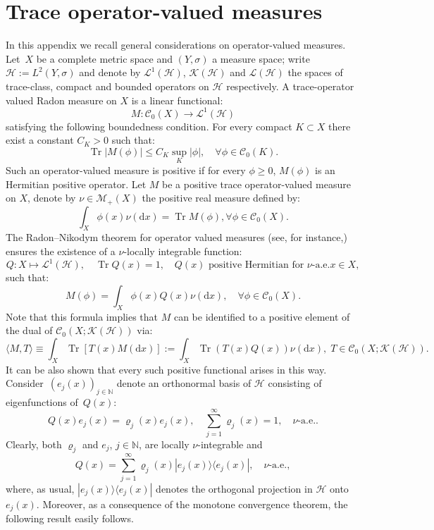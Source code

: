 \documentclass[AHL,Unicode,longabstracts]{cedram}
\DeclareMathOperator{\Trr}{Tr}
\newcommand*\N{{\mathbb N}}
\newcommand*\Tr{\Trr}
\newcommand{\To}{\longrightarrow}
\numberwithin{equation}{section}
\let\oldforall\forall
\renewcommand*{\forall}{\mathrel{\oldforall}}
\newcommand*{\dd}{\mathrm{d}}
\newcommand*{\dx}{\dd x}
\begin{document}
\section{Trace operator-valued measures}\label{sec:ovm}
In this appendix we recall general considerations on operator-valued measures. Let~$X$ be a complete metric space and $(Y,\sigma)$ a measure space; write $\mathcal{H}:=L^2(Y,\sigma)$ and denote by $\mathcal{L}^1(\mathcal{H})$, $\mathcal{K}(\mathcal{H})$ and $\mathcal{L}(\mathcal{H})$ the spaces of trace-class, compact and bounded operators on $\mathcal{H}$ respectively. A trace-operator valued Radon measure on $X$ is a linear functional:
\[
M:\mathcal{C}_0(X)\To \mathcal{L}^1(\mathcal{H})
\]
satisfying the following boundedness condition. For every compact $K\subset X$ there exist a constant $C_K>0$ such that:
\[
\Tr|M(\phi)|\leq C_K \sup_K|\phi|,\quad \forall \phi\in\mathcal{C}_0(K).
\]
Such an operator-valued measure is positive if for every $\phi\geq0$, $M(\phi)$ is an Hermitian positive operator. Let $M$ be a positive trace operator-valued measure on $X$, denote by $\nu\in\mathcal{M}_+(X)$ the positive real measure defined by:
\[
\int_X\phi(x)\nu(\dx)=\Tr M(\phi), \forall \phi\in\mathcal{C}_0(X).
\]
The Radon--Nikodym theorem for operator valued measures (see, for instance,\linebreak \cite[the Appendix]{GerardMDM91}) ensures the existence of a $\nu$-locally integrable function:
\[
Q:X\longmapsto \mathcal{L}^1(\mathcal{H}),\quad \Tr Q(x)=1, \quad Q(x) \text{ positive Hermitian for } \nu \text{-a.e.} x\in X,
\]
such that:
\[
M(\phi)=\int_X \phi(x) Q(x)\nu(\dx),\quad \forall \phi\in\mathcal{C}_0(X).
\]
Note that this formula implies that $M$ can be identified to a positive element of the dual of $\mathcal{C}_0(X;\mathcal{K}(\mathcal{H}))$ via:
\[
\langle M, T \rangle \equiv \int_X \Tr[T(x)M(\dx)]:=\int_X \Tr(T(x)Q(x))\nu(\dx),\;T\in \mathcal{C}_0(X;\mathcal{K}(\mathcal{H})).
\]
It can be also shown that every such positive functional arises in this way. \linebreak Consider~$(e_j(x))_{j\in\N}$ denote an orthonormal basis of $\mathcal{H}$ consisting of eigenfunctions of~$Q(x)$:
\[
Q(x)e_j(x)=\varrho_j(x) e_j(x),\quad \sum_{j=1}^\infty \varrho_j(x)=1,\quad \nu\text{-a.e.}.
\]
Clearly, both $\varrho_j$ and $e_j$, $j\in\N$, are locally $\nu$-integrable and
\[
Q(x)=\sum_{j=1}^\infty \varrho_j(x)|e_j(x)\rangle \langle e_j(x)|,\quad \nu\text{-a.e.},
\]
where, as usual, $|e_j(x)\rangle \langle e_j(x)|$ denotes the orthogonal projection in $\mathcal{H}$ onto $e_j(x)$. Moreover, as a consequence of the monotone convergence theorem, the following result easily follows.
\end{document}
